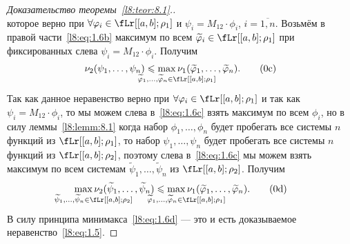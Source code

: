 \begin{proof}[Доказательство теоремы~\ref{l8:teor:8.1}.]
\begin{equation}
	\end{equation}
	которое верно при $\forall\phi_i\in\fLr[{[a,b];\rho_1}]$ и $\psi_i=M_{12}\cdot\phi_i$, $i=\overline{1,n}$. Возьмём в правой части~\eqref{l8:eq:1.6b} максимум по всем $\widetilde{\phi}_i\in\fLr[{[a,b];\rho_1}]$ при фиксированных слева $\psi_i=M_{12}\cdot\phi_i$. Получим
	\begin{equation}\label{l8:eq:1.6c}
		\nu_2(\psi_1,\ldots,\psi_n)\leqslant\max\limits_{\lefteqn{\vphantom{\big(}\scriptstyle \widetilde{\phi}_1,\ldots,\widetilde{\phi}_n\in\fLr[{[a,b];\rho_1}]}}\nu_1(\widetilde{\phi}_1,\ldots,\widetilde{\phi}_n).\tag{\theequation c}
	\end{equation}
	Так как данное неравенство верно при $\forall\phi_i\in\fLr[{[a,b];\rho_1}]$ и так как $\psi_i=M_{12}\cdot\phi_i$, то мы можем слева в~\eqref{l8:eq:1.6c} взять максимум по всем $\phi_i$, но в силу леммы~\ref{l8:lemm:8.1} когда набор $\phi_1,\ldots,\phi_n$ будет пробегать все системы $n$ функций из $\fLr[{[a,b];\rho_1}]$, то набор $\psi_1,\ldots,\psi_n$ будет пробегать все системы $n$ функций из $\fLr[{[a,b];\rho_2}]$, поэтому слева в~\eqref{l8:eq:1.6c} мы можем взять максимум по всем системам $\widetilde{\psi}_1,\ldots,\widetilde{\psi}_n$ из $\fLr[{[a,b];\rho_2}]$. Получим
	\begin{equation}\label{l8:eq:1.6d}
		\max\limits_{\lefteqn{\vphantom{\big(}\scriptstyle \widetilde{\psi}_1,\ldots,\widetilde{\psi}_n\in\fLr[{[a,b];\rho_2}]}}\nu_2(\widetilde{\psi}_1,\ldots,\widetilde{\psi}_n)\leqslant\max\limits_{\lefteqn{\vphantom{\big(}\scriptstyle \widetilde{\phi}_1,\ldots,\widetilde{\phi}_n\in\fLr[{[a,b];\rho_1}]}}\nu_1(\widetilde{\phi}_1,\ldots,\widetilde{\phi}_n).\tag{\theequation d}
	\end{equation}
	В силу принципа минимакса~\eqref{l8:eq:1.6d} --- это и есть доказываемое неравенство~\eqref{l8:eq:1.5}.
\end{proof}

